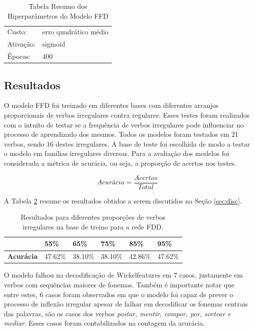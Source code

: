 \begin{table}[H]
\centering
\begin{tabular}{ll}
Custo: & erro quadrático médio \\
Ativação: & sigmoid \\
Épocas: & 400 \\
\end{tabular}
\caption{Tabela Resumo dos Hiperparâmetros do Modelo FFD}
\label{tab:resumo1}
\end{table}

\subsection{Resultados}

O modelo FFD foi treinado em diferentes bases com diferentes arranjos proporcionais de verbos irregulares contra regulares. Esses testes foram realizados com o intuito de testar se a frequência de verbos irregulares pode influenciar no processo de aprendizado dos mesmos. Todos os modelos foram testados em 21 verbos, sendo 16 destes irregulares. A base de teste foi escolhida de modo a testar o modelo em famílias irregulares diversas. Para a avaliação dos modelos foi considerada a métrica de acurácia, ou seja, a proporção de acertos nos testes. 

\begin{equation}
Acurácia = \frac{Acertos}{Total}
\end{equation}

A Tabela \ref{tab:resultadosfdd} resume os resultados obtidos a serem discutidos na Seção \ref{sec:disc}.

\begin{table}[H]
\centering
\begin{tabular}{llllll}
 & \textbf{55\%} & \textbf{65\%} & \textbf{75\%} & \textbf{85\%} & \textbf{95\%} \\ \hline
\textbf{Acurácia} & 47.62\% & 38.10\% & 38.10\% & 42.86\% & 47.62\% 
\end{tabular}
\caption{Resultados para diferentes proporções de verbos irregulares na base de treino para a rede FDD.}
\label{tab:resultadosfdd}
\end{table}

O modelo falhou na decodificação de Wickelfeatures em 7 casos, justamente em verbos com sequências maiores de fonemas. Também é importante notar que entre estes, 6 casos foram observados em que o modelo foi capaz de prever o processo de inflexão irregular apesar de falhar em decodificar os fonemas centrais das palavras, são os casos dos verbos \textit{postar, mentir, compor, por, sortear e mediar}. Esses casos foram contabilizados na contagem da acurácia.

